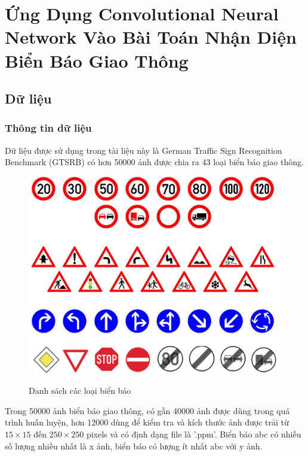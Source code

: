 \everymath{\displaystyle}

\chapter{Ứng Dụng Convolutional Neural Network Vào Bài Toán Nhận Diện Biển Báo Giao Thông }
\label{chap:chap5}
\section{Dữ liệu}
\subsection{Thông tin dữ liệu}
\hspace{5mm}Dữ liệu được sử dụng trong tài liệu này là German Traffic Sign Recognition Benchmark (GTSRB) có hơn 50000 ảnh được chia ra 43 loại biển báo giao thông. 
\begin{figure}[H]
\begin{center}
\label{fig:data_sample}
\includegraphics[scale=0.5]{chap5/image/data_sample.png}
\caption{Danh sách các loại biển báo}
\end{center}
\end{figure}
Trong 50000 ảnh biển báo giao thông, có gần 40000 ảnh được dùng trong quá trình huấn luyện, hơn 12000 dùng để kiểm tra và kích thước ảnh được trải từ $15\times 15$ đến $250\times250$ pixels và có định dạng file là '.ppm'. Biển báo abc có nhiều số lượng nhiều nhất là x ảnh, biển báo có lượng ít nhất abc với y ảnh.
